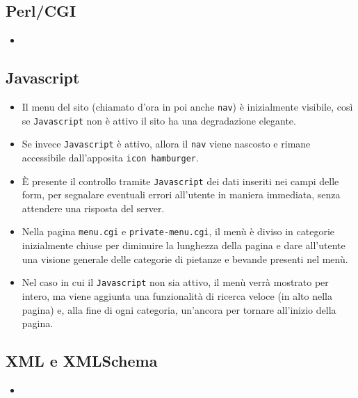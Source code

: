\documentclass[../relazione.tex]{subfiles}
\begin{document}
	\subsection{Perl/CGI}
	\begin{itemize}
		\item 
	\end{itemize}
	\subsection{Javascript}
	\begin{itemize}
		\item Il menu del sito (chiamato d'ora in poi anche \texttt{nav}) è inizialmente visibile, così se \texttt{Javascript} non è attivo il sito ha una degradazione elegante.
		\item Se invece \texttt{Javascript} è attivo, allora il \texttt{nav} viene nascosto e rimane accessibile dall'apposita \texttt{icon hamburger}.
		\item È presente il controllo tramite \texttt{Javascript} dei dati inseriti nei campi delle form, per segnalare eventuali errori all'utente in maniera immediata, senza attendere una risposta del server.
		\item Nella pagina \texttt{menu.cgi} e \texttt{private-menu.cgi}, il menù è diviso in categorie inizialmente chiuse per diminuire la lunghezza della pagina e dare all'utente una visione generale delle categorie di pietanze e bevande presenti nel menù.
		\item Nel caso in cui il \texttt{Javascript} non sia attivo, il menù verrà mostrato per intero, ma viene aggiunta una funzionalità di ricerca veloce (in alto nella pagina) e, alla fine di ogni categoria, un'ancora per tornare all'inizio della pagina.
	\end{itemize}
	\subsection{XML e XMLSchema}
	\begin{itemize}
		\item 
	\end{itemize}
\end{document}
